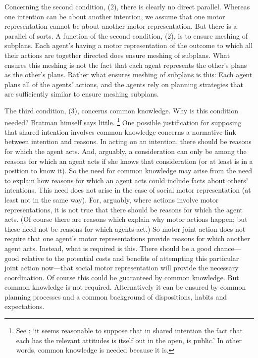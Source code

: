 \documentclass[12pt,\papersize]{extarticle}
\begin{document}
Concerning the second condition, (2), there is clearly no {direct} parallel. 
Whereas one intention can be about another intention, 
we assume that one motor representation cannot be about another motor representation.
But there is a parallel of sorts. 
A function of the second condition, (2), is to ensure meshing of subplans. 
Each agent's having a motor representation of the outcome to which all their actions are together directed does ensure meshing of subplans.
What ensures this meshing is not the fact that each agent represents the other's plans {as the other's plans}.
Rather what ensures meshing of subplans is this:
Each agent plans all of the agents' actions, and the agents rely on planning strategies that are sufficiently similar to ensure meshing subplans.


The third condition, (3), concerns common knowledge.
Why is this condition needed?
Bratman himself says little.%
\footnote{
See \citet[p.\ 117]{Bratman:1993je}:
`it seems reasonable to suppose that in shared intention the fact that each has the relevant attitudes is itself out in the open, is public.' 
In other words, common knowledge is needed because it is.
}
One possible justification for supposing that shared intention involves common knowledge concerns a normative link between intention and reasons.
In acting on an intention, there should be reasons for which the  agent acts.
And, arguably, a consideration can only be among the reasons for which an agent acts if she knows that consideration (or at least is in a position to know it).
So the need for common knowledge may arise from the need to explain how reasons for which an agent acts could include facts about others' intentions.
This need does not arise in the case of social motor representation (at least not in the same way).
For, arguably, where actions involve motor representations, it is not true that there should be reasons for which the agent acts.
(Of course there are reasons which explain why motor actions happen; but these need not be reasons for which agents act.)
So motor joint action does not require that one agent's motor representations provide reasons for which another agent acts.
Instead, what is required is this.
There should be a good chance---good relative to the potential costs and benefits of attempting this particular joint action now---that social motor representation will provide the necessary coordination.
Of course this could be guaranteed by common knowledge. 
But common knowledge is not required.
Alternatively it can be ensured by common planning processes and a common {background} of dispositions, habits and expectations.%
\end{document}
